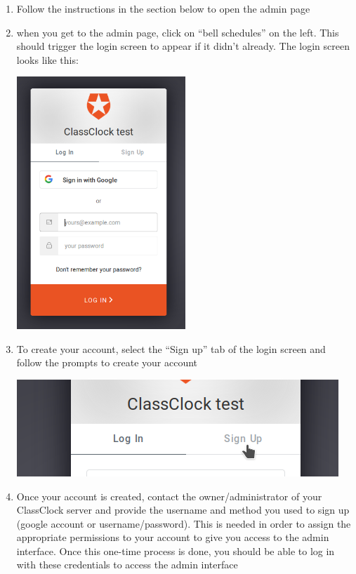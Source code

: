 \documentclass{article}
\begin{document}
\begin{enumerate}
\item {Follow the instructions in the section below to open the admin page}
\item {when you get to the admin page, click on “bell schedules” on the left. This should trigger the login screen to appear if
it didn't already. The login screen looks like this:
}
\begin{center}
\includegraphics[width=0.5\textwidth]{images/login-page.png}
\end{center}
\item {To create your account, select the “Sign up” tab of the login screen and follow the prompts to create your account}
\begin{center}
\includegraphics[width=4.7701in,height=1.4366in]{images/login-clicking-signup.png}
\end{center}

\item {Once your account is created, contact the owner/administrator of your ClassClock server and provide the username and
method you used to sign up (google account or username/password). This is needed in order to assign the appropriate
permissions to your account to give you access to the admin interface. Once this one-time process is done, you should
be able to log in with these credentials to access the admin interface}
\end{enumerate}
\end{document}
